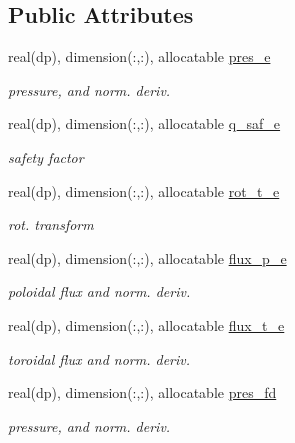 \subsection*{Public Attributes}
\begin{DoxyCompactItemize}
\item 
real(dp), dimension(\+:,\+:), allocatable \hyperlink{structeq__vars_1_1eq__1__type_a203223883a300a3617bca2683bc5292d}{pres\+\_\+e}
\begin{DoxyCompactList}\small\item\em pressure, and norm. deriv. \end{DoxyCompactList}\item 
real(dp), dimension(\+:,\+:), allocatable \hyperlink{structeq__vars_1_1eq__1__type_a8735980af7b3fae23eb10ded6ef5b462}{q\+\_\+saf\+\_\+e}
\begin{DoxyCompactList}\small\item\em safety factor \end{DoxyCompactList}\item 
real(dp), dimension(\+:,\+:), allocatable \hyperlink{structeq__vars_1_1eq__1__type_a61b6de6cab3634a8eb5037b68349f668}{rot\+\_\+t\+\_\+e}
\begin{DoxyCompactList}\small\item\em rot. transform \end{DoxyCompactList}\item 
real(dp), dimension(\+:,\+:), allocatable \hyperlink{structeq__vars_1_1eq__1__type_a9b0854f41928f9e007ab188387d78cb1}{flux\+\_\+p\+\_\+e}
\begin{DoxyCompactList}\small\item\em poloidal flux and norm. deriv. \end{DoxyCompactList}\item 
real(dp), dimension(\+:,\+:), allocatable \hyperlink{structeq__vars_1_1eq__1__type_a008d9ec3d19f2b469f07e9dedb6f9acd}{flux\+\_\+t\+\_\+e}
\begin{DoxyCompactList}\small\item\em toroidal flux and norm. deriv. \end{DoxyCompactList}\item 
real(dp), dimension(\+:,\+:), allocatable \hyperlink{structeq__vars_1_1eq__1__type_a8f13d5b0d7375b769334d2863291d0a2}{pres\+\_\+fd}
\begin{DoxyCompactList}\small\item\em pressure, and norm. deriv. \end{DoxyCompactList}\item 

\end{DoxyCompactItemize}
